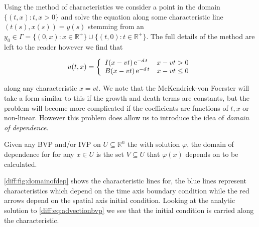 \documentclass[../main.tex]{subfiles}
\begin{document}
  Using the method of characteristics we consider a point in the domain $\{(t, x) : t, x > 0 \}$ and solve the equation along some characteristic line $(t(s), x(s)) = y(s)$ stemming from an $y_0 \in \Gamma = \{ (0, x) : x \in \mathbb{R}^+ \} \cup \{ (t, 0) : t \in \mathbb{R}^+ \}$. The full details of the method are left to the reader however we find that

  \begin{equation} \label{diff:eq:advectionsol}
    u(t, x) = \left\lbrace \begin{array}{ll}
      I(x - v t) \operatorname{e}^{-d \, t} & x - vt > 0 \\
      B(x - v t) \operatorname{e}^{-d \, t} & x - vt \leq 0 \\
  \end{array} \right.
  \end{equation}

  along any characteristic $x = vt$. We note that the McKendrick-von Foerster will take a form similar to this if the growth and death terms are constants, but the problem will become more complicated if the coefficients are functions of $t, x$ or non-linear. However this problem does allow us to introduce the idea of \emph{domain of dependence}.

  \begin{definition}
    Given any BVP and/or IVP on $U \subseteq \mathbb{R}^n$ the with solution $\varphi$, the domain of dependence for for any $x \in U$ is the set $V \subseteq U$ that $\varphi(x)$ depends on to be calculated.
  \end{definition}

  \autoref{diff:fig:domainofdep} shows the characteristic lines for, the blue lines represent characteristics which depend on the time axis boundary condition while the red arrows depend on the spatial axis initial condition. Looking at the analytic solution to \autoref{diff:eq:advectionbvp} we see that the initial condition is carried along the characteristic.
\end{document}
